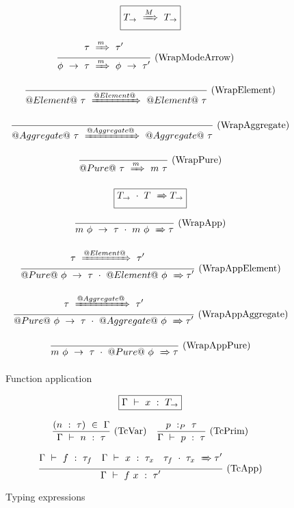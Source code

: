 \begin{figure}

$$
\boxed{T_{\to} ~\xRightarrow{M}~ T_{\to}}
$$

$$
\frac {\displaystyle 
    \tau ~\xRightarrow{m}~ \tau'
} {\displaystyle 
    \phi~\to~\tau ~\xRightarrow{m}~ \phi~\to~\tau'
} \ 
\textrm{(WrapModeArrow)}
\quad
$$

$$
\frac {\displaystyle  } {\displaystyle 
    @Element@~\tau ~\xRightarrow{@Element@}~ @Element@~\tau
} \ 
\textrm{(WrapElement)}
$$

$$
\frac {\displaystyle  } {\displaystyle 
    @Aggregate@~\tau ~\xRightarrow{@Aggregate@}~ @Aggregate@~\tau
} \ 
\textrm{(WrapAggregate)}
$$

$$
\frac {\displaystyle  } {\displaystyle 
    @Pure@~\tau ~\xRightarrow{m}~ m~\tau
} \ 
\textrm{(WrapPure)}
$$


$$
\boxed{T_{\to}~\cdot~T ~\xRightarrow~ T_{\to}}
$$

$$
\frac {\displaystyle 
} {\displaystyle 
    m~\phi~\to~\tau~\cdot~m~\phi ~\xRightarrow~ \tau
} \ 
\textrm{(WrapApp)}
$$


$$
\frac {\displaystyle 
    \tau ~\xRightarrow{@Element@}~ \tau'
} {\displaystyle 
    @Pure@~\phi~\to~\tau~\cdot~@Element@~\phi ~\xRightarrow~ \tau'
} \ 
\textrm{(WrapAppElement)}
$$

$$
\frac {\displaystyle 
    \tau ~\xRightarrow{@Aggregate@}~ \tau'
} {\displaystyle 
    @Pure@~\phi~\to~\tau~\cdot~@Aggregate@~\phi ~\xRightarrow~ \tau'
} \ 
\textrm{(WrapAppAggregate)}
$$

$$
\frac {\displaystyle 
} {\displaystyle 
    m~\phi~\to~\tau~\cdot~@Pure@~\phi ~\xRightarrow~ \tau
} \ 
\textrm{(WrapAppPure)}
$$


\caption{Function application}
\label{fig:source:type:wrap}
\end{figure}

\begin{figure}

$$
\boxed{\Gamma ~\vdash~ x ~:~ T_\to}
$$


$$
\frac {\displaystyle 
    (n~:~\tau) ~\in~ \Gamma
} {\displaystyle  
    \Gamma ~\vdash~ n ~:~ \tau
} \ 
\textrm{(TcVar)}
\quad
\frac {\displaystyle 
    p ~:_{P}~ \tau
} {\displaystyle 
    \Gamma ~\vdash~ p ~:~ \tau
} \ 
\textrm{(TcPrim)}
$$

$$
\frac {\displaystyle 
    \Gamma ~\vdash~ f ~:~ \tau_f
    \quad
    \Gamma ~\vdash~ x ~:~ \tau_x
    \quad
    \tau_f~\cdot~\tau_x ~\xRightarrow~ \tau'
} {\displaystyle 
    \Gamma ~\vdash~ f~x ~:~ \tau'
} \ 
\textrm{(TcApp)}
$$


\caption{Typing expressions}
\label{fig:source:type:exp}
\end{figure}

